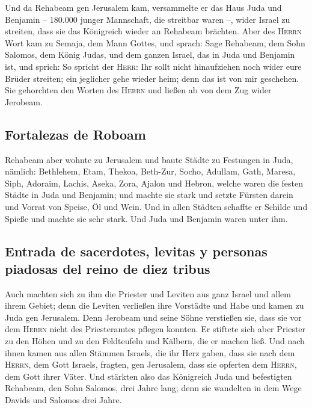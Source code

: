  Und da Rehabeam gen Jerusalem kam, versammelte er das
Haus Juda und Benjamin -- 180.000 junger Mannschaft, die streitbar waren
--, wider Israel zu streiten, dass sie das Königreich wieder an Rehabeam
brächten.  Aber des \textsc{Herrn} Wort kam zu Semaja, dem
Mann Gottes, und sprach:  Sage Rehabeam, dem Sohn Salomos,
dem König Judas, und dem ganzen Israel, das in Juda und Benjamin ist,
und sprich:  So spricht der \textsc{Herr}: Ihr sollt nicht
hinaufziehen noch wider eure Brüder streiten; ein jeglicher gehe wieder
heim; denn das ist von mir geschehen. Sie gehorchten den Worten des
\textsc{Herrn} und ließen ab von dem Zug wider Jerobeam.

\hypertarget{fortalezas-de-roboam}{%
\subsection{Fortalezas de Roboam}\label{fortalezas-de-roboam}}

 Rehabeam aber wohnte zu Jerusalem und baute Städte zu
Festungen in Juda,  nämlich: Bethlehem, Etam, Thekoa,
 Beth-Zur, Socho, Adullam,  Gath, Maresa,
Siph,  Adoraim, Lachis, Aseka,  Zora,
Ajalon und Hebron, welche waren die festen Städte in Juda und Benjamin;
 und machte sie stark und setzte Fürsten darein und
Vorrat von Speise, Öl und Wein.  Und in allen Städten
schaffte er Schilde und Spieße und machte sie sehr stark. Und Juda und
Benjamin waren unter ihm.

\hypertarget{entrada-de-sacerdotes-levitas-y-personas-piadosas-del-reino-de-diez-tribus}{%
\subsection{Entrada de sacerdotes, levitas y personas piadosas del reino
de diez
tribus}\label{entrada-de-sacerdotes-levitas-y-personas-piadosas-del-reino-de-diez-tribus}}

 Auch machten sich zu ihm die Priester und Leviten aus
ganz Israel und allem ihrem Gebiet;  denn die Leviten
verließen ihre Vorstädte und Habe und kamen zu Juda gen Jerusalem. Denn
Jerobeam und seine Söhne verstießen sie, dass sie vor dem \textsc{Herrn}
nicht des Priesteramtes pflegen konnten.  Er stiftete
sich aber Priester zu den Höhen und zu den Feldteufeln und Kälbern, die
er machen ließ.  Und nach ihnen kamen aus allen Stämmen
Israels, die ihr Herz gaben, dass sie nach dem \textsc{Herrn}, dem Gott
Israels, fragten, gen Jerusalem, dass sie opferten dem \textsc{Herrn},
dem Gott ihrer Väter.  Und stärkten also das Königreich
Juda und befestigten Rehabeam, den Sohn Salomos, drei Jahre lang; denn
sie wandelten in dem Wege Davids und Salomos drei Jahre.

